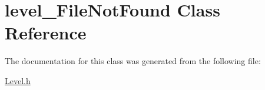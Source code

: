\hypertarget{classlevel___file_not_found}{}\section{level\+\_\+\+File\+Not\+Found Class Reference}
\label{classlevel___file_not_found}


The documentation for this class was generated from the following file\+:\begin{DoxyCompactItemize}
\item 
\hyperlink{_level_8h}{Level.\+h}\end{DoxyCompactItemize}
